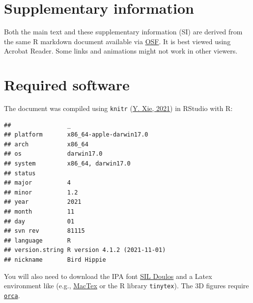 \documentclass[
  11pt,
  english,
  man,floatsintext]{apa6}
\begin{document}
\endgroup

\newpage
\renewcommand{\thesection}{\S \arabic{section}}

\hypertarget{supplementary-information}{%
\section*{Supplementary information}\label{supplementary-information}}

\setcounter{section}{1}

Both the main text and these supplementary information (SI) are derived from the same R markdown document available via \href{https://osf.io/q7gjp/}{OSF}. It is best viewed using Acrobat Reader. Some links and animations might not work in other viewers.

\hypertarget{sec:SI-software}{%
\section{Required software}\label{sec:SI-software}}

The document was compiled using \texttt{knitr} (\protect\hyperlink{ref-xie2021}{Y. Xie, 2021}) in RStudio with R:

\begin{verbatim}
##                _                           
## platform       x86_64-apple-darwin17.0     
## arch           x86_64                      
## os             darwin17.0                  
## system         x86_64, darwin17.0          
## status                                     
## major          4                           
## minor          1.2                         
## year           2021                        
## month          11                          
## day            01                          
## svn rev        81115                       
## language       R                           
## version.string R version 4.1.2 (2021-11-01)
## nickname       Bird Hippie
\end{verbatim}

You will also need to download the IPA font \href{https://software.sil.org/doulos/download/}{SIL Doulos} and a Latex environment like (e.g., \href{https://tug.org/mactex/mactex-download.html}{MacTex} or the R library \texttt{tinytex}). The 3D figures require \href{https://github.com/plotly/orca\#installation}{\texttt{orca}}.
\end{document}
